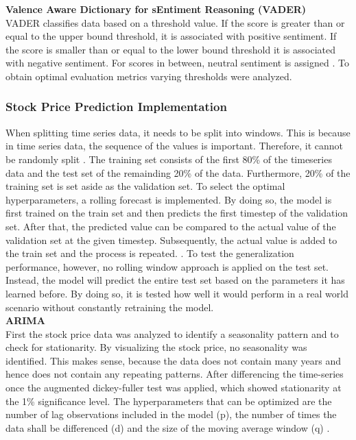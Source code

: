 \documentclass[11pt, a4paper]{article}
\begin{document}
\noindent\textbf{Valence Aware Dictionary for sEntiment Reasoning (VADER)}\\
VADER classifies data based on a threshold value.
If the score is greater than or equal to the upper bound threshold, it is associated with positive sentiment. If the score is smaller than or equal to the lower bound threshold it is associated with negative sentiment. For scores
in between, neutral sentiment is assigned \citep{hutto2015vader}. To obtain optimal evaluation metrics varying thresholds were analyzed.

\subsubsection{Stock Price Prediction Implementation}
When splitting time series data, it needs to be split into windows. This is because in time series data, the sequence of the values is important.
Therefore, it cannot be randomly split \citep{lebaron1998split}.
The training set consists of the first 80\% of the timeseries data and the test set of the remainding 20\% of the data. Furthermore, 20\% of the training set is set aside as the validation set.
To select the optimal hyperparameters, a rolling forecast is implemented. 
By doing so, the model is first trained on the train set and then predicts the first timestep of the validation set. After that, the
predicted value can be compared to the actual value of the validation set at the given timestep. Subsequently, the actual value
is added to the train set and the process is repeated. \citep{sima2018timeseries}. To test the generalization performance, however, no
rolling window approach is applied on the test set. Instead, the model will predict the entire test set based on the parameters
it has learned before. By doing so, it is tested how well it would perform in a real world scenario without constantly retraining the model.\\

\noindent\textbf{ARIMA}\\
First the stock price data was analyzed to identify a seasonality pattern and to check for stationarity.
By visualizing the stock price, no seasonality was identified. This makes sense, because the data does not contain many years and
hence does not contain any repeating patterns.
After differencing the time-series once the augmented dickey-fuller test was applied, which showed stationarity at the 1\% significance level.
The hyperparameters that can be optimized are the number of lag observations
included in the model (p), the number of times the data shall be differenced (d) and the size of the moving average window (q) \citep{sima2018timeseries}.\\
\end{document}
